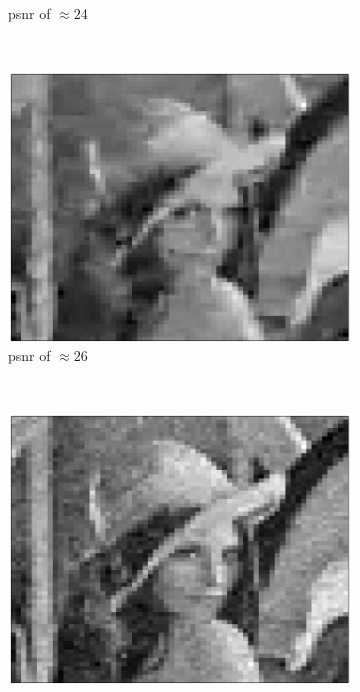 \documentclass{article}
\begin{document}
\begin{figure}[h]
\begin{subfigure}[b]{0.19\textwidth}
				\caption{psnr of $\approx 24$}
				\label{psnr_24}
		\end{subfigure}%
		~ %
		\begin{subfigure}[b]{0.19\textwidth}
                \centering
				\includegraphics[width=\textwidth]{img/img_26_psnr}
				\caption{psnr of $\approx 26$}
				\label{psnr_26}
		\end{subfigure}%
		~ %
		\begin{subfigure}[b]{0.19\textwidth}
                \centering
				\includegraphics[width=\textwidth]{img/img_28_psnr}

\end{subfigure}
\end{figure}
\end{document}
